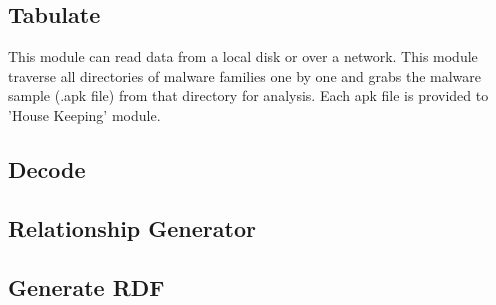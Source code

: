 
\subsection{Tabulate}
\label{Tabulate}
This module can read data from a local disk or over a network. This module traverse all directories of malware families one by one and grabs the malware sample (.apk file) from that directory for analysis. Each apk file is provided to 'House Keeping' module.

\subsection{Decode}
\label{Decode}

\subsection{Relationship Generator}
\label{Relationship Generator}

\subsection{Generate RDF}
\label{Generate RDF}


